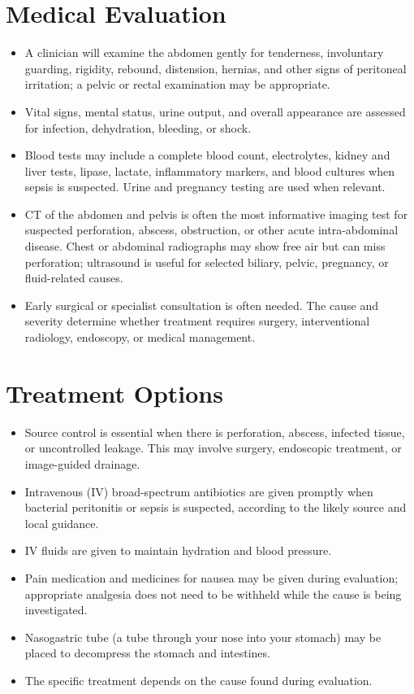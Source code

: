 \section*{Medical Evaluation}
\begin{itemize}
  \item A clinician will examine the abdomen gently for tenderness, involuntary guarding, rigidity, rebound, distension, hernias, and other signs of peritoneal irritation; a pelvic or rectal examination may be appropriate.
  \item Vital signs, mental status, urine output, and overall appearance are assessed for infection, dehydration, bleeding, or shock.
  \item Blood tests may include a complete blood count, electrolytes, kidney and liver tests, lipase, lactate, inflammatory markers, and blood cultures when sepsis is suspected. Urine and pregnancy testing are used when relevant.
  \item CT of the abdomen and pelvis is often the most informative imaging test for suspected perforation, abscess, obstruction, or other acute intra-abdominal disease. Chest or abdominal radiographs may show free air but can miss perforation; ultrasound is useful for selected biliary, pelvic, pregnancy, or fluid-related causes.
  \item Early surgical or specialist consultation is often needed. The cause and severity determine whether treatment requires surgery, interventional radiology, endoscopy, or medical management.
\end{itemize}

\section*{Treatment Options}
\begin{itemize}
  \item Source control is essential when there is perforation, abscess, infected tissue, or uncontrolled leakage. This may involve surgery, endoscopic treatment, or image-guided drainage.
  \item Intravenous (IV) broad-spectrum antibiotics are given promptly when bacterial peritonitis or sepsis is suspected, according to the likely source and local guidance.
  \item IV fluids are given to maintain hydration and blood pressure.
  \item Pain medication and medicines for nausea may be given during evaluation; appropriate analgesia does not need to be withheld while the cause is being investigated.
  \item Nasogastric tube (a tube through your nose into your stomach) may be placed to decompress the stomach and intestines.
  \item The specific treatment depends on the cause found during evaluation.
\end{itemize}

